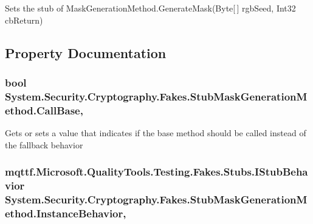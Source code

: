 Sets the stub of Mask\-Generation\-Method.\-Generate\-Mask(\-Byte\mbox{[}$\,$\mbox{]} rgb\-Seed, Int32 cb\-Return)



\subsection{Property Documentation}
\hypertarget{class_system_1_1_security_1_1_cryptography_1_1_fakes_1_1_stub_mask_generation_method_a6ab2ae80965e073edf6b5521317cac97}{
\subsubsection[{Call\-Base}]{\setlength{\rightskip}{0pt plus 5cm}bool System.\-Security.\-Cryptography.\-Fakes.\-Stub\-Mask\-Generation\-Method.\-Call\-Base\hspace{0.3cm}{\ttfamily [get]}, {\ttfamily [set]}}}\label{class_system_1_1_security_1_1_cryptography_1_1_fakes_1_1_stub_mask_generation_method_a6ab2ae80965e073edf6b5521317cac97}


Gets or sets a value that indicates if the base method should be called instead of the fallback behavior

\hypertarget{class_system_1_1_security_1_1_cryptography_1_1_fakes_1_1_stub_mask_generation_method_a67986d42e9be28820b301d266c86e59c}{
\subsubsection[{Instance\-Behavior}]{\setlength{\rightskip}{0pt plus 5cm}mqttf.\-Microsoft.\-Quality\-Tools.\-Testing.\-Fakes.\-Stubs.\-I\-Stub\-Behavior System.\-Security.\-Cryptography.\-Fakes.\-Stub\-Mask\-Generation\-Method.\-Instance\-Behavior\hspace{0.3cm}{\ttfamily [get]}, {\ttfamily [set]}}}\label{class_system_1_1_security_1_1_cryptography_1_1_fakes_1_1_stub_mask_generation_method_a67986d42e9be28820b301d266c86e59c}


